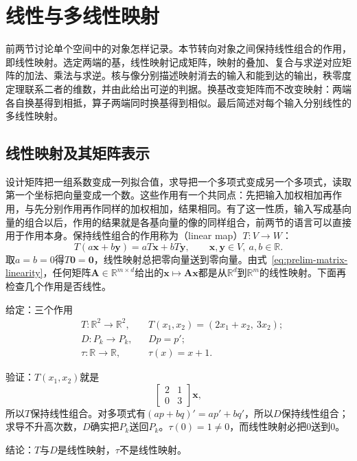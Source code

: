 
\section{线性与多线性映射}
\label{sec:ls-linear-maps}
\label{sec:linear-algebra-matrices-linear-maps}

前两节讨论单个空间中的对象怎样记录。本节转向对象之间保持线性组合的作用，即线性映射。选定两端的基，线性映射记成矩阵，映射的叠加、复合与求逆对应矩阵的加法、乘法与求逆。核与像分别描述映射消去的输入和能到达的输出，秩零度定理联系二者的维数，并由此给出可逆的判据。换基改变矩阵而不改变映射：两端各自换基得到相抵，算子两端同时换基得到相似。最后简述对每个输入分别线性的多线性映射。

\subsection{线性映射及其矩阵表示}
\label{sec:ls-linear-map-definition}
\label{sec:linear-algebra-maps}

设计矩阵把一组系数变成一列拟合值，求导把一个多项式变成另一个多项式，读取第一个坐标把向量变成一个数。这些作用有一个共同点：先把输入加权相加再作用，与先分别作用再作同样的加权相加，结果相同。有了这一性质，输入写成基向量的组合以后，作用的结果就是各基向量的像的同样组合，前两节的语言可以直接用于作用本身。保持线性组合的作用称为（linear map）$T:V\to W$：
\begin{equation}
T(a\bm x+b\bm y)=aT\bm x+bT\bm y,\qquad\bm x,\bm y\in V,\ a,b\in\mathbb R.
\label{eq:ls-linear-map-def}
\end{equation}
取$a=b=0$得$T\bm0=\bm0$，线性映射总把零向量送到零向量。由式~\eqref{eq:prelim-matrix-linearity}，任何矩阵$\bm A\in\mathbb R^{m\times d}$给出的$\bm x\mapsto\bm A\bm x$都是从$\mathbb R^d$到$\mathbb R^m$的线性映射。下面再检查几个作用是否线性。
\begin{example}[线性与非线性的作用]
\label{ex:ls-linear-map-checks}
给定：三个作用
\[
 \begin{aligned}
 &T:\mathbb R^2\to\mathbb R^2, &&T(x_1,x_2)=(2x_1+x_2,\ 3x_2);\\
 &D:P_k\to P_k, &&Dp=p';\\
 &\tau:\mathbb R\to\mathbb R, &&\tau(x)=x+1.
 \end{aligned}
\]

验证：$T(x_1,x_2)$就是
\[
 \begin{bmatrix}2&1\\0&3\end{bmatrix}\bm x,
\]
所以$T$保持线性组合。对多项式有$(ap+bq)'=ap'+bq'$，所以$D$保持线性组合；求导不升高次数，$D$确实把$P_k$送回$P_k$。$\tau(0)=1\neq0$，而线性映射必把$0$送到$0$。

结论：$T$与$D$是线性映射，$\tau$不是线性映射。
\end{example}

